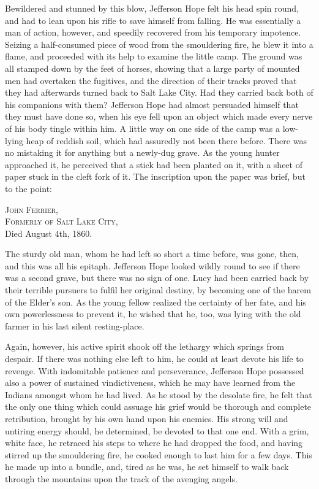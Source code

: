 Bewildered and stunned by this blow, Jefferson Hope felt his head spin round, and had to lean upon his rifle to save himself from falling. He was essentially a man of action, however, and speedily recovered from his temporary impotence. Seizing a half-consumed piece of wood from the smouldering fire, he blew it into a flame, and proceeded with its help to examine the little camp. The ground was all stamped down by the feet of horses, showing that a large party of mounted men had overtaken the fugitives, and the direction of their tracks proved that they had afterwards turned back to Salt Lake City. Had they carried back both of his companions with them? Jefferson Hope had almost persuaded himself that they must have done so, when his eye fell upon an object which made every nerve of his body tingle within him. A little way on one side of the camp was a low-lying heap of reddish soil, which had assuredly not been there before. There was no mistaking it for anything but a newly-dug grave. As the young hunter approached it, he perceived that a stick had been planted on it, with a sheet of paper stuck in the cleft fork of it. The inscription upon the paper was brief, but to the point:
\centerline{\textsc{John Ferrier,}\\
\textsc{Formerly of Salt Lake City,}\\
Died August 4th, 1860.}

The sturdy old man, whom he had left so short a time before, was gone, then, and this was all his epitaph. Jefferson Hope looked wildly round to see if there was a second grave, but there was no sign of one. Lucy had been carried back by their terrible pursuers to fulfil her original destiny, by becoming one of the harem of the Elder's son. As the young fellow realized the certainty of her fate, and his own powerlessness to prevent it, he wished that he, too, was lying with the old farmer in his last silent resting-place.

Again, however, his active spirit shook off the lethargy which springs from despair. If there was nothing else left to him, he could at least devote his life to revenge. With indomitable patience and perseverance, Jefferson Hope possessed also a power of sustained vindictiveness, which he may have learned from the Indians amongst whom he had lived. As he stood by the desolate fire, he felt that the only one thing which could assuage his grief would be thorough and complete retribution, brought by his own hand upon his enemies. His strong will and untiring energy should, he determined, be devoted to that one end. With a grim, white face, he retraced his steps to where he had dropped the food, and having stirred up the smouldering fire, he cooked enough to last him for a few days. This he made up into a bundle, and, tired as he was, he set himself to walk back through the mountains upon the track of the avenging angels.

